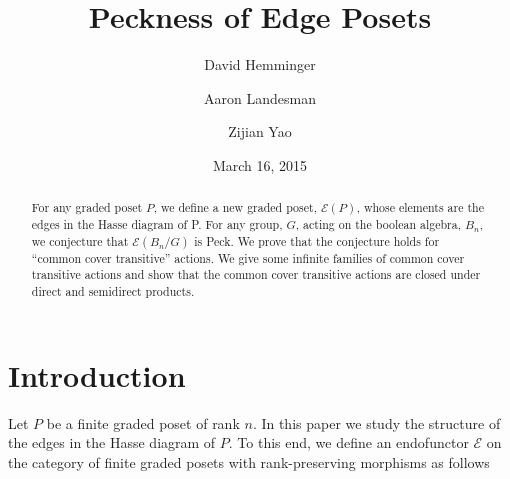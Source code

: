 \documentclass[smallextended, envcountsame, numbook]{svjour3}
\numberwithin{equation}{section}
\begin{document}
\title{Peckness of Edge Posets}

\author{David Hemminger      \and
        Aaron Landesman 		 \and
        Zijian Yao
}


\date{March 16, 2015}


\maketitle

\begin{abstract}
For any graded poset $P$, we define a new graded poset, $\mathcal E(P)$, whose elements are the edges in the Hasse diagram of P. For any group, $G$, acting on the boolean algebra, $B_n$, we conjecture that $\mathcal E(B_n/G)$ is Peck. We prove that the conjecture holds for ``common cover transitive'' actions. We give some infinite families of common cover transitive actions and show that the common cover transitive actions are closed under direct and semidirect products.

\end{abstract}

\section{Introduction}\label{sec:introduction}


Let $P$ be a finite graded poset of rank $n$.  In this paper we study the structure of the edges in the Hasse diagram of $P$.  To this end, we define an endofunctor $\mathcal{E}$ on the category of finite graded posets with rank-preserving morphisms as follows
\end{document}
